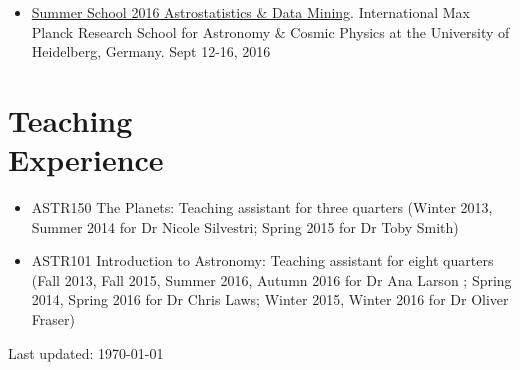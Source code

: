 \documentclass[margin]{res}
\begin{document}
\begin{resume}
\begin{itemize}
	\item \href{https://www.imprs-hd.mpg.de/147422/Summer-School-2016}{Summer School 2016 Astrostatistics \& Data Mining}. International Max Planck Research School for Astronomy \& Cosmic Physics at the University of Heidelberg, Germany. Sept 12-16, 2016

\end{itemize}


\section{Teaching \\Experience}
\begin{itemize}   
	
\item ASTR150 The Planets: Teaching assistant for  three quarters (Winter 2013, Summer 2014 for Dr Nicole Silvestri; Spring 2015 for Dr Toby Smith)

\item ASTR101 Introduction to Astronomy: Teaching assistant for  eight quarters (Fall 2013, Fall 2015, Summer 2016, Autumn 2016 for Dr Ana Larson ; Spring 2014, Spring 2016 for Dr Chris Laws; Winter 2015, Winter 2016 for Dr Oliver Fraser) \\
\end{itemize}


\vfill \hfill {\small Last updated: \today}
\end{resume}
\end{document}
